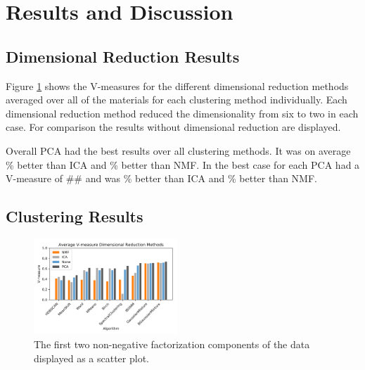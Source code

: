 \documentclass[a4paper,11pt]{article}
\begin{document}

\section{Results and Discussion}

\subsection{Dimensional Reduction Results}

Figure \ref{results:dr} shows the V-measures for the different dimensional reduction methods averaged over all of the materials for each clustering method individually. Each dimensional reduction method reduced the dimensionality from six to two in each case. For comparison the results without dimensional reduction are displayed.

Overall PCA had the best results over all clustering methods. It was on average \% better than ICA and \% better than NMF. In the best case for each PCA had a V-measure of \#\# and was \% better than ICA and \% better than NMF.

\subsection{Clustering Results}

\begin{figure}
  
  \begin{center}
    \includegraphics[width=0.48\textwidth]{figures/red_methods.png}
  \end{center}
  
  \caption{The first two non-negative factorization components of the data displayed as a scatter plot.}
  
  \label{results:dr}
\end{figure}
\end{document}
